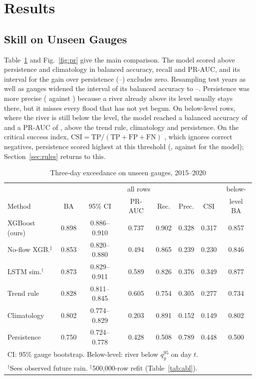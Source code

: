 \documentclass[conference]{IEEEtran}
\begin{document}
\section{Results}
\subsection{Skill on Unseen Gauges}
Table~\ref{tab:main} and Fig.~\ref{fig:pr} give the main comparison. The model scored above persistence and climatology in balanced accuracy, recall and PR-AUC, and its interval for the gain over persistence (\DiffPersLo--\DiffPersHi) excludes zero. Resampling test years as well as gauges widened the interval of its balanced accuracy to \MainBAGYLo--\MainBAGYHi. Persistence was more precise (\PersPrec{} against \XgbPrec) because a river already above its level usually stays there, but it misses every flood that has not yet begun. On below-level rows, where the river is still below the level, the model reached a balanced accuracy of \OnXgbBA{} and a PR-AUC of \OnXgbPR, above the trend rule, climatology and persistence. On the critical success index, $\mathrm{CSI}=\mathrm{TP}/(\mathrm{TP}+\mathrm{FP}+\mathrm{FN})$ \cite{Jolliffe2012}, which ignores correct negatives, persistence scored highest at this threshold (\PersCSI, against \XgbCSI{} for the model); Section~\ref{sec:rules} returns to this.

\begin{table}[t]
\caption{Three-day exceedance on \NTestGauges{} unseen gauges, 2015--2020}
\label{tab:main}
\centering
\footnotesize
\setlength{\tabcolsep}{1.7pt}
\begin{tabular}{lccccccc}
\toprule
 & \multicolumn{6}{c}{all rows} & below-\\
Method & BA & 95\% CI & PR-AUC & Rec. & Prec. & CSI & level BA\\
\midrule
XGBoost (ours) & 0.898 & 0.886--0.910 & 0.737 & 0.902 & 0.328 & 0.317 & 0.857\\
No-flow XGB.$^\ddagger$ & 0.853 & 0.820--0.880 & 0.494 & 0.865 & 0.239 & 0.230 & 0.846\\
LSTM sim.$^\dagger$ & 0.873 & 0.829--0.911 & 0.589 & 0.826 & 0.376 & 0.349 & 0.877\\
Trend rule & 0.828 & 0.811--0.845 & 0.605 & 0.754 & 0.305 & 0.277 & 0.734\\
Climatology & 0.802 & 0.774--0.829 & 0.203 & 0.891 & 0.152 & 0.149 & 0.802\\
Persistence & 0.750 & 0.724--0.778 & 0.428 & 0.508 & 0.789 & 0.448 & 0.500\\
\bottomrule
\multicolumn{8}{l}{\scriptsize CI: 95\% gauge bootstrap. Below-level: river below $q^{95}_g$ on day $t$.}\\
\multicolumn{8}{l}{\scriptsize $^\dagger$Sees observed future rain. $^\ddagger$500,000-row refit (Table~\ref{tab:abl}).}\\
\end{tabular}
\end{table}
\end{document}
